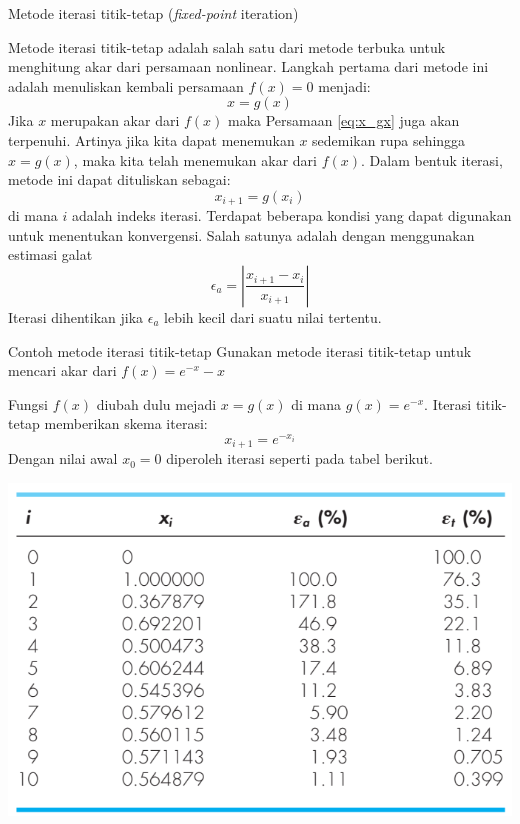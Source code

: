 \begin{frame}{Metode iterasi titik-tetap (\textit{fixed-point} iteration)}
\fontsize{10}{11}\selectfont

Metode iterasi titik-tetap adalah salah satu dari metode terbuka untuk menghitung
akar dari persamaan nonlinear.
Langkah pertama dari metode ini adalah menuliskan kembali persamaan
$f(x) = 0$ menjadi:
\begin{equation}
x = g(x)  
\label{eq:x_gx}
\end{equation}
Jika $x$ merupakan akar dari $f(x)$ maka Persamaan \eqref{eq:x_gx}
juga akan terpenuhi. Artinya jika kita dapat menemukan $x$ sedemikan rupa sehingga
$x = g(x)$, maka kita telah menemukan akar dari $f(x)$.
Dalam bentuk iterasi, metode ini dapat dituliskan sebagai:
$$
x_{i+1} = g(x_{i})
$$
di mana $i$ adalah indeks iterasi. Terdapat beberapa kondisi yang dapat
digunakan untuk menentukan konvergensi. Salah satunya adalah dengan
menggunakan estimasi galat
$$
\epsilon_{a} = \left| \frac{x_{i+1} - x_{i}}{x_{i+1}} \right|
$$
Iterasi dihentikan jika $\epsilon_{a}$ lebih kecil dari suatu nilai
tertentu.
\end{frame}


\begin{frame}
\fontsize{9}{10}\selectfont

\begin{block}{Contoh metode iterasi titik-tetap}
Gunakan metode iterasi titik-tetap untuk mencari akar dari
$f(x) = e^{-x} - x$
\end{block}
Fungsi $f(x)$ diubah dulu mejadi $x = g(x)$ di mana $g(x) = e^{-x}$.
Iterasi titik-tetap memberikan skema iterasi:
$$
x_{i+1} = e^{-x_{i}}
$$
Dengan nilai awal $x_0 = 0$ diperoleh iterasi seperti pada tabel berikut.

{\centering
\includegraphics[height=0.5\textheight]{../chapra_7th/Chapra_Table_Example_6_1.png}
\par}

\end{frame}


